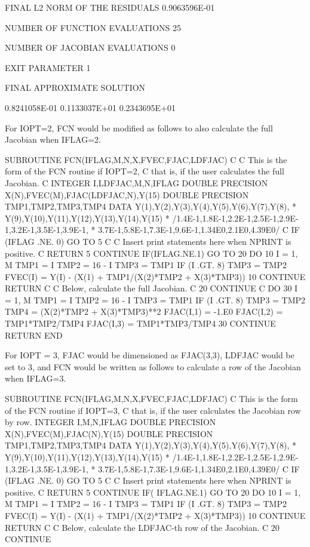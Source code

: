 \documentclass[11pt,twoside,nolof]{starlink}
\begin{document}
\begin{terminalv}
       FINAL L2 NORM OF THE RESIDUALS  0.9063596E-01

       NUMBER OF FUNCTION EVALUATIONS        25

       NUMBER OF JACOBIAN EVALUATIONS         0

       EXIT PARAMETER                         1

       FINAL APPROXIMATE SOLUTION

        0.8241058E-01  0.1133037E+01  0.2343695E+01


       For IOPT=2, FCN would be modified as follows to also
       calculate the full Jacobian when IFLAG=2.

       SUBROUTINE FCN(IFLAG,M,N,X,FVEC,FJAC,LDFJAC)
 C
 C     This is the form of the FCN routine if IOPT=2,
 C     that is, if the user calculates the full Jacobian.
 C
       INTEGER I,LDFJAC,M,N,IFLAG
       DOUBLE PRECISION X(N),FVEC(M),FJAC(LDFJAC,N),Y(15)
       DOUBLE PRECISION TMP1,TMP2,TMP3,TMP4
       DATA Y(1),Y(2),Y(3),Y(4),Y(5),Y(6),Y(7),Y(8),
      *     Y(9),Y(10),Y(11),Y(12),Y(13),Y(14),Y(15)
      *     /1.4E-1,1.8E-1,2.2E-1,2.5E-1,2.9E-1,3.2E-1,3.5E-1,3.9E-1,
      *      3.7E-1,5.8E-1,7.3E-1,9.6E-1,1.34E0,2.1E0,4.39E0/
 C
       IF (IFLAG .NE. 0) GO TO 5
 C
 C     Insert print statements here when NPRINT is positive.
 C
       RETURN
     5 CONTINUE
       IF(IFLAG.NE.1) GO TO 20
       DO 10 I = 1, M
          TMP1 = I
          TMP2 = 16 - I
          TMP3 = TMP1
          IF (I .GT. 8) TMP3 = TMP2
          FVEC(I) = Y(I) - (X(1) + TMP1/(X(2)*TMP2 + X(3)*TMP3))
    10    CONTINUE
       RETURN
 C
 C     Below, calculate the full Jacobian.
 C
    20    CONTINUE
 C
       DO 30 I = 1, M
          TMP1 = I
          TMP2 = 16 - I
          TMP3 = TMP1
          IF (I .GT. 8) TMP3 = TMP2
          TMP4 = (X(2)*TMP2 + X(3)*TMP3)**2
          FJAC(I,1) = -1.E0
          FJAC(I,2) = TMP1*TMP2/TMP4
          FJAC(I,3) = TMP1*TMP3/TMP4
    30    CONTINUE
       RETURN
       END


       For IOPT = 3, FJAC would be dimensioned as FJAC(3,3),
         LDFJAC would be set to 3, and FCN would be written as
         follows to calculate a row of the Jacobian when IFLAG=3.

       SUBROUTINE FCN(IFLAG,M,N,X,FVEC,FJAC,LDFJAC)
 C     This is the form of the FCN routine if IOPT=3,
 C     that is, if the user calculates the Jacobian row by row.
       INTEGER I,M,N,IFLAG
       DOUBLE PRECISION X(N),FVEC(M),FJAC(N),Y(15)
       DOUBLE PRECISION TMP1,TMP2,TMP3,TMP4
       DATA Y(1),Y(2),Y(3),Y(4),Y(5),Y(6),Y(7),Y(8),
      *     Y(9),Y(10),Y(11),Y(12),Y(13),Y(14),Y(15)
      *     /1.4E-1,1.8E-1,2.2E-1,2.5E-1,2.9E-1,3.2E-1,3.5E-1,3.9E-1,
      *      3.7E-1,5.8E-1,7.3E-1,9.6E-1,1.34E0,2.1E0,4.39E0/
 C
       IF (IFLAG .NE. 0) GO TO 5
 C
 C     Insert print statements here when NPRINT is positive.
 C
       RETURN
     5 CONTINUE
       IF( IFLAG.NE.1) GO TO 20
       DO 10 I = 1, M
          TMP1 = I
          TMP2 = 16 - I
          TMP3 = TMP1
          IF (I .GT. 8) TMP3 = TMP2
          FVEC(I) = Y(I) - (X(1) + TMP1/(X(2)*TMP2 + X(3)*TMP3))
    10    CONTINUE
       RETURN
 C
 C     Below, calculate the LDFJAC-th row of the Jacobian.
 C
    20 CONTINUE


\end{terminalv}
\end{document}
